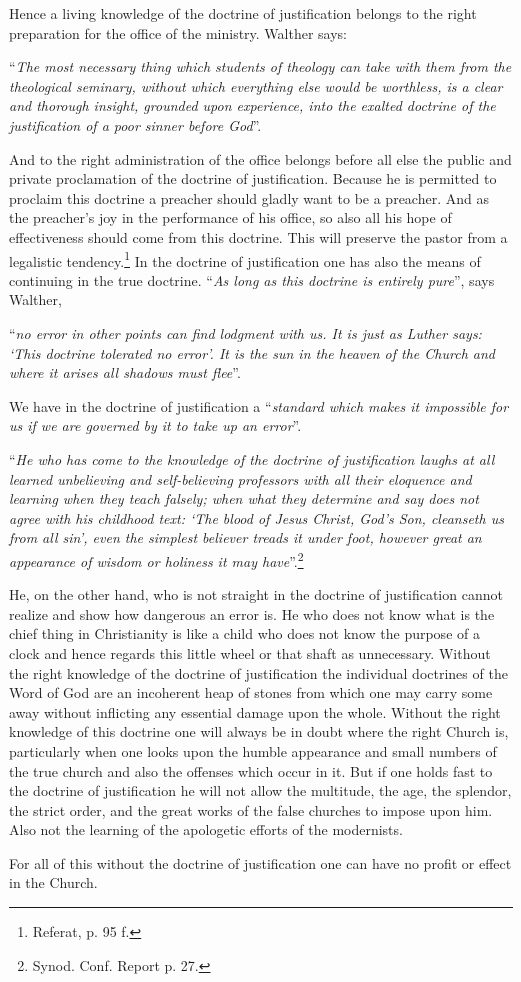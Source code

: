                 Hence a living knowledge of the doctrine of justification belongs to the right preparation for the office of the ministry.  Walther says: \begin{displayquote}“\textit{The most necessary thing which students of theology can take with them from the theological seminary, without which everything else would be worthless, is a clear and thorough insight, grounded upon experience, into the exalted doctrine of the justification of a poor sinner before God}”.\end{displayquote}  And to the right administration of the office belongs before all else the public and private proclamation of the doctrine of justification.  Because he is permitted to proclaim this doctrine a preacher should gladly want to be a preacher.  And as the preacher’s joy in the performance of his office, so also all his hope of effectiveness should come from this doctrine.  This will preserve the pastor from a legalistic tendency.\footnote{Referat, p. 95 f.}  In the doctrine of justification one has also the means of continuing in the true doctrine.  “\textit{As long as this doctrine is entirely pure}”, says Walther, \begin{displayquote}“\textit{no error in other points can find lodgment with us.  It is just as Luther says: ‘This doctrine tolerated no error’.  It is the sun in the heaven of the Church and where it arises all shadows must flee}”.\end{displayquote}  We have in the doctrine of justification a “\textit{standard which makes it impossible for us if we are governed by it to take up an error}”.  \begin{displayquote}“\textit{He who has come to the knowledge of the doctrine of justification laughs at all learned unbelieving and self-believing professors with all their eloquence and learning when they teach falsely; when what they determine and say does not agree with his childhood text: ‘The blood of Jesus Christ, God’s Son, cleanseth us from all sin’, even the simplest believer treads it under foot, however great an appearance of wisdom or holiness it may have}”.\footnote{Synod. Conf. Report p. 27.}\end{displayquote}  He, on the other hand, who is not straight in the doctrine of justification cannot realize and show how dangerous an error is.  He who does not know what is the chief thing in Christianity is like a child who does not know the purpose of a clock and hence regards this little wheel or that shaft as unnecessary.  Without the right knowledge of the doctrine of justification the individual doctrines of the Word of God are an incoherent heap of stones from which one may carry some away without inflicting any essential damage upon the whole.  Without the right knowledge of this doctrine one will always be in doubt where the right Church is, particularly when one looks upon the humble appearance and small numbers of the true church and also the offenses which occur in it.  But if one holds fast to the doctrine of justification he will not allow the multitude, the age, the splendor, the strict order, and the great works of the false churches to impose upon him.  Also not the learning of the apologetic efforts of the modernists.  \par For all of this without the doctrine of justification one can have no profit or effect in the Church.
